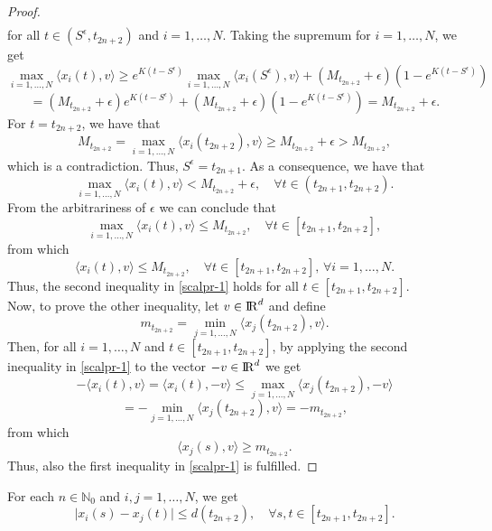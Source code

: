 \documentclass[a4paper,11pt,oneside]{article}
\newcommand{\RR}{{{\rm I} \kern -.15em {\rm R} }}
\begin{document}
\begin{proof}
$$\begin{array}{l}
		\end{array}
		$$for all $t\in (S^{\epsilon}, t_{2n+2})$ and $i=1,\dots,N$. Taking the supremum for $i=1,\dots,N$, we get 
		$$\max_{i=1,\dots,N}\langle x_{i}(t),v\rangle\geq  e^{K(t-S^{\epsilon})}\max_{i=1,\dots,N}\langle x_{i}(S^{\epsilon}),v\rangle+(M_{t_{2n+2}}+\epsilon)(1-e^{K(t-S^{\epsilon})})$$$$=(M_{t_{2n+2}}+\epsilon)e^{K(t-S^{\epsilon})}+(M_{t_{2n+2}}+\epsilon)(1-e^{K(t-S^{\epsilon})})=M_{t_{2n+2}}+\epsilon.$$
		For $t= t_{2n+2}$, we have that $$M_{t_{2n+2}}=\max_{i=1,\dots,N}\langle x_{i}(t_{2n+2}),v\rangle \geq M_{t_{2n+2}}+\epsilon>M_{t_{2n+2}},$$
		which is a contradiction. Thus, $S^{\epsilon}=t_{2n+1}$. As a consequence, we have that $$\max_{i=1,\dots,N}\langle x_{i}(t),v\rangle<M_{t_{2n+2}}+\epsilon, \quad \forall t\in (t_{2n+1},t_{2n+2}).$$
		From the arbitrariness of $\epsilon$ we can conclude that $$\max_{i=1,\dots,N}\langle x_{i}(t),v\rangle\leq M_{t_{2n+2}}, \quad \forall t\in [t_{2n+1},t_{2n+2}],$$
		from which $$\langle x_{i}(t),v\rangle\leq M_{t_{2n+2}}, \quad \forall t\in [t_{2n+1},t_{2n+2}], \,\forall i=1,\dots,N.$$
		Thus, the second inequality in \eqref{scalpr-1} holds for all $t\in [t_{2n+1},t_{2n+2}]$.
		\\Now, to prove the other inequality, let $v\in \RR^{d}$ and define $$m_{t_{2n+2}}=\min_{j=1,\dots,N}\langle x_{j}(t_{2n+2}),v\rangle.$$
		Then, for all $i=1,\dots,N$ and $t\in[t_{2n+1},t_{2n+2}]$, by applying the second inequality in \eqref{scalpr-1} to the vector $-v\in\RR^{d}$ we get $$-\langle x_{i}(t),v\rangle=\langle x_{i}(t),-v\rangle\leq \max_{j=1,\dots,N}\langle x_{j}(t_{2n+2}),-v\rangle$$$$=-\min_{j=1,\dots,N}\langle x_{j}(t_{2n+2}),v\rangle=-m_{t_{2n+2}},$$
		from which $$\langle x_{j}(s),v\rangle\geq m_{t_{2n+2}}.$$
		Thus, also the first inequality in \eqref{scalpr-1} is fulfilled.
	\end{proof}
	\begin{lem}\label{L2-1}
		For each $n\in \mathbb{N}_{0}$ and $i,j=1,\dots,N$, we get \begin{equation}
			\label{dist-1}
			\lvert x_{i}(s)-x_{j}(t)\rvert\leq d(t_{2n+2}), \quad\forall s,t\in [t_{2n+1},t_{2n+2}].
		\end{equation} 
	\end{lem}
\end{document}
